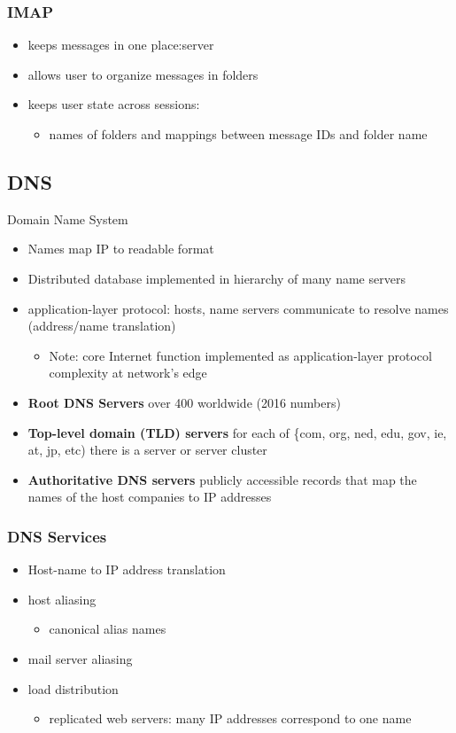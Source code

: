 \documentclass[11pt]{article}
\begin{document}
\subsubsection{IMAP}
\label{sec:org3960252}
\begin{itemize}
\item keeps messages in one place:server
\item allows user to organize messages in folders
\item keeps user state across sessions:
\begin{itemize}
\item names of folders and mappings between message IDs and folder name
\end{itemize}
\end{itemize}

\subsection{DNS}
\label{sec:org7ac1217}
Domain Name System

\begin{itemize}
\item Names map IP to readable format
\item Distributed database implemented in hierarchy of many name servers
\item application-layer protocol: hosts, name servers communicate to
resolve names (address/name translation)
\begin{itemize}
\item Note: core Internet function implemented as application-layer
protocol complexity at network's edge
\end{itemize}

\item \textbf{Root DNS Servers} over 400 worldwide (2016 numbers)
\item \textbf{Top-level domain (TLD) servers} for each of \{com, org, ned, edu,
gov, ie, at, jp, etc) there is a server or server cluster
\item \textbf{Authoritative DNS servers} publicly accessible records that map the
names of the host companies to IP addresses
\end{itemize}


\subsubsection{DNS Services}
\label{sec:orgd7134d1}
\begin{itemize}
\item Host-name to IP address translation
\item host aliasing
\begin{itemize}
\item canonical alias names
\end{itemize}
\item mail server aliasing
\item load distribution 
\begin{itemize}
\item replicated web servers: many IP addresses correspond to one name
\end{itemize}
\end{itemize}
\end{document}
